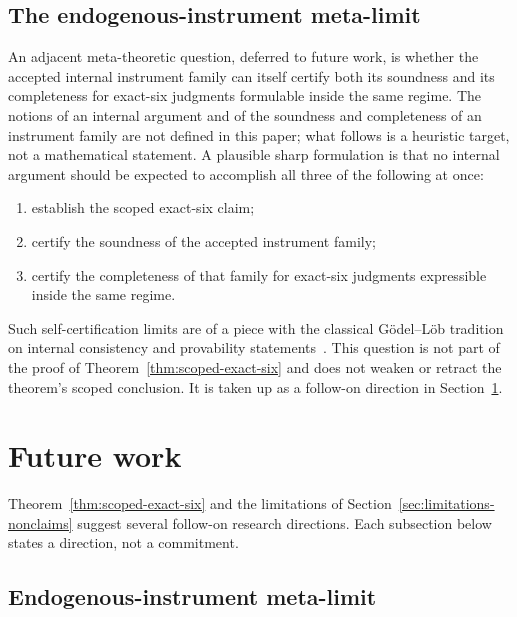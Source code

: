 \documentclass[11pt]{article}
\theoremstyle{definition}
\begin{document}
\subsection{The endogenous-instrument meta-limit}\label{subsec:meta-limit}

An adjacent meta-theoretic question, deferred to future work, is
whether the accepted internal instrument family can itself certify
both its soundness and its completeness for exact-six judgments
formulable inside the same regime. The notions of an internal argument and of
the soundness and completeness of an instrument family are not defined in this
paper; what follows is a heuristic target, not a mathematical statement. A
plausible sharp formulation is
that no internal argument should be expected to accomplish all three
of the following at once:
\begin{enumerate}[topsep=2pt,itemsep=1pt]
  \item establish the scoped exact-six claim;
  \item certify the soundness of the accepted instrument family;
  \item certify the completeness of that family for exact-six
    judgments expressible inside the same regime.
\end{enumerate}
Such self-certification limits are of a piece with the classical
G{\"o}del--L{\"o}b tradition on internal consistency and provability
statements~\citep{Godel1931,Lob1955}. This question is not part of
the proof of Theorem~\ref{thm:scoped-exact-six} and does not weaken
or retract the theorem's scoped conclusion. It is taken up as a
follow-on direction in Section~\ref{sec:future-work}.
 \section{Future work}\label{sec:future-work}


Theorem~\ref{thm:scoped-exact-six} and the limitations of
Section~\ref{sec:limitations-nonclaims} suggest several follow-on
research directions. Each subsection below states a direction, not a
commitment.

\subsection{Endogenous-instrument meta-limit}\label{subsec:future-meta-limit}
\end{document}
